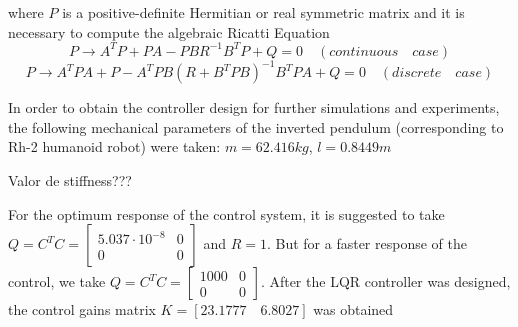 where $P$ is a positive-definite Hermitian or real symmetric matrix and it is necessary to compute the algebraic Ricatti Equation
\begin{equation}
P \rightarrow A^{T}P+PA-PBR^{-1}B^{T}P+Q = 0 \quad (continuous \quad case)
\end{equation}
\begin{equation}
P \rightarrow A^{T}PA+P-A^{T}PB(R+B^{T}PB)^{-1}B^{T}PA+Q = 0 \quad (discrete \quad case)
\end{equation}


In order to obtain the controller design for further simulations and experiments, the following mechanical parameters of the inverted pendulum (corresponding to Rh-2 humanoid robot) were taken: $m = 62.416 kg$, $l=0.8449 m$

Valor de stiffness???

For the optimum response of the control system, it is suggested to take $Q = C^{T}C = \begin{bmatrix}
5.037 \cdot 10^{-8} & 0\\
0 & 0
\end{bmatrix}$ and $R = 1 $. But for a faster response of the control, we take $Q = C^{T}C = \begin{bmatrix}
1000 & 0\\
0 & 0
\end{bmatrix}$.  After the LQR controller was designed, the control gains matrix $K = [23.1777 \quad 6.8027]$ was obtained









